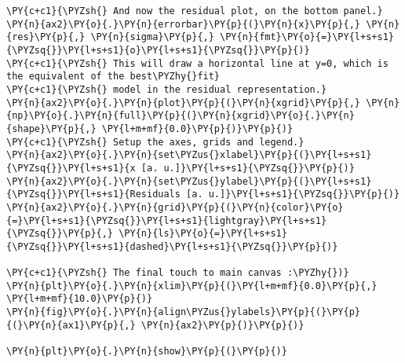 \begin{Verbatim}[label=\makebox{\href{https://bitbucket.org/lbaldini/statnotes/src/master/snippets/residual\_plot.py}{https://bitbucket.org/.../residual\_plot.py}},commandchars=\\\{\}]
\PY{c+c1}{\PYZsh{} And now the residual plot, on the bottom panel.}
\PY{n}{ax2}\PY{o}{.}\PY{n}{errorbar}\PY{p}{(}\PY{n}{x}\PY{p}{,} \PY{n}{res}\PY{p}{,} \PY{n}{sigma}\PY{p}{,} \PY{n}{fmt}\PY{o}{=}\PY{l+s+s1}{\PYZsq{}}\PY{l+s+s1}{o}\PY{l+s+s1}{\PYZsq{}}\PY{p}{)}
\PY{c+c1}{\PYZsh{} This will draw a horizontal line at y=0, which is the equivalent of the best\PYZhy{}fit}
\PY{c+c1}{\PYZsh{} model in the residual representation.}
\PY{n}{ax2}\PY{o}{.}\PY{n}{plot}\PY{p}{(}\PY{n}{xgrid}\PY{p}{,} \PY{n}{np}\PY{o}{.}\PY{n}{full}\PY{p}{(}\PY{n}{xgrid}\PY{o}{.}\PY{n}{shape}\PY{p}{,} \PY{l+m+mf}{0.0}\PY{p}{)}\PY{p}{)}
\PY{c+c1}{\PYZsh{} Setup the axes, grids and legend.}
\PY{n}{ax2}\PY{o}{.}\PY{n}{set\PYZus{}xlabel}\PY{p}{(}\PY{l+s+s1}{\PYZsq{}}\PY{l+s+s1}{x [a. u.]}\PY{l+s+s1}{\PYZsq{}}\PY{p}{)}
\PY{n}{ax2}\PY{o}{.}\PY{n}{set\PYZus{}ylabel}\PY{p}{(}\PY{l+s+s1}{\PYZsq{}}\PY{l+s+s1}{Residuals [a. u.]}\PY{l+s+s1}{\PYZsq{}}\PY{p}{)}
\PY{n}{ax2}\PY{o}{.}\PY{n}{grid}\PY{p}{(}\PY{n}{color}\PY{o}{=}\PY{l+s+s1}{\PYZsq{}}\PY{l+s+s1}{lightgray}\PY{l+s+s1}{\PYZsq{}}\PY{p}{,} \PY{n}{ls}\PY{o}{=}\PY{l+s+s1}{\PYZsq{}}\PY{l+s+s1}{dashed}\PY{l+s+s1}{\PYZsq{}}\PY{p}{)}

\PY{c+c1}{\PYZsh{} The final touch to main canvas :\PYZhy{})}
\PY{n}{plt}\PY{o}{.}\PY{n}{xlim}\PY{p}{(}\PY{l+m+mf}{0.0}\PY{p}{,} \PY{l+m+mf}{10.0}\PY{p}{)}
\PY{n}{fig}\PY{o}{.}\PY{n}{align\PYZus{}ylabels}\PY{p}{(}\PY{p}{(}\PY{n}{ax1}\PY{p}{,} \PY{n}{ax2}\PY{p}{)}\PY{p}{)}

\PY{n}{plt}\PY{o}{.}\PY{n}{show}\PY{p}{(}\PY{p}{)}
\end{Verbatim}